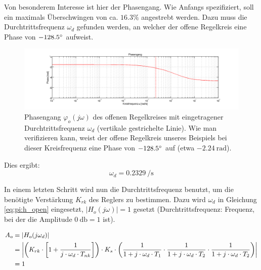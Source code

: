 Von besonderem  Interesse ist  hier der Phasengang. Wie  Anfangs spezifiziert,
soll  ein maximals  \"Uberschwingen von  ca. $16.3\%$ angestrebt  werden. Dazu
muss die Durchtrittsfrequenz $\omega_d$ gefunden werden, an welcher der offene
Regelkreis eine Phase von $-128.5\degree$ aufweist. \footnotemark[2]


\begin{figure}[h! width=\pagewidth]
    \includegraphics[width=\textwidth]{images/piOffenerRegelkreisPhasengang.png}
    \caption{%
        Phasengang   $\varphi_o(j\omega)$   des   offenen   Regelkreises   mit
        eingetragener Durchtrittsfrequenz $\omega_{d}$ (vertikale gestrichelte
        Linie). Wie man verifizieren kann, weist der offene Regelkreis unseres
        Beispiels bei dieser Kreisfrequenz  eine Phase von $-128.5\degree$ auf
        (etwa $\SI{-2.24}{\radian}$).
    }
    \label{fig:pi:omega_d}
\end{figure}

Dies ergibt:
\begin{equation} \label{eq:pi:omega_d}
    \omega_d = \SI{0.2329}{\per\second}
\end{equation}

In  einem  letzten  Schritt  wird  nun  die  Durchtrittsfrequenz  benutzt,  um
die  ben\"otigte Verst\"arkung  $K_{rk}$ des  Reglers zu  bestimmen. Dazu wird
$\omega_d$ in  Gleichung \ref{eq:pi:h_open}  eingesetzt, $|H_o(j\omega)|  = 1$
gesetzt    (Durchtrittsfrequenz: Frequenz,     bei    der     die    Amplitude
$\SI{0}{\decibel} = 1$ ist).

\begin{gather} \label{eq:pi:A_o_set_to_one}
    \begin{split}
        A_o & = | H_o (j\omega_d) | \\
            & = \abs*{
                    \bigg(
                        K_{rk} \cdot \biggl[ 1 + \frac{1}{j \cdot \omega_d \cdot T_{nk}} \biggr]
                    \bigg)
                    \cdot
                    K_s
                    \cdot
                    \bigg(
                            \frac{1}{1 + j \cdot \omega_d \cdot T_1}
                      \cdot \frac{1}{1 + j \cdot \omega_d \cdot T_2}
                      \cdot \frac{1}{1 + j \cdot \omega_d \cdot T_2}
                      \bigg)} \\
              & = 1
    \end{split}
\end{gather}

